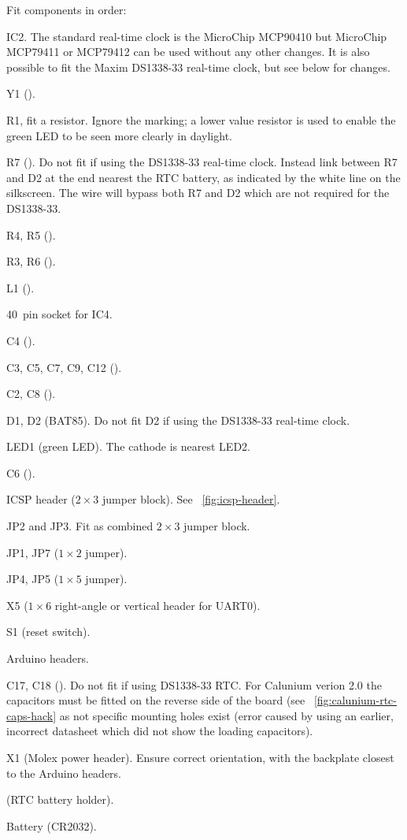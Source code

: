 Fit components in order:
\begin{buildorder}
\item IC2. The standard real-time clock is the MicroChip MCP90410 but
  MicroChip MCP79411 or MCP79412 can be used without any other
  changes.
  It is also possible to fit the Maxim DS1338-33 real-time clock,
  but see below for changes.
\item Y1 ().
\item R1, fit a  resistor. Ignore the  marking; a
  lower value resistor is used to enable the green LED to be seen
  more clearly in daylight.
\item R7 (). Do not fit if using the DS1338-33 real-time
  clock. Instead link between R7 and D2 at the end nearest the RTC
  battery, as indicated by the white line on the silkscreen. The wire
  will bypass both R7 and D2 which are not required for the DS1338-33.
\item R4, R5 ().
\item R3, R6 ().
\item L1 ().
\item 40~pin socket for IC4.
\item C4 ().
\item C3, C5, C7, C9, C12 ().
\item C2, C8 ().
\item D1, D2 (BAT85). Do not fit D2 if using the DS1338-33 real-time clock.
\item LED1 (green LED). The cathode is nearest LED2.
\item C6 ().
\item ICSP header ($2 \times 3$ jumper block). See
  \figurename~\ref{fig:icsp-header}.
\item JP2 and JP3. Fit as combined $2 \times 3$ jumper block.
\item JP1, JP7 ($1 \times 2$ jumper).
\item JP4, JP5 ($1 \times 5$ jumper).
\item X5 ($1 \times 6$ right-angle or vertical header for UART0).
\item S1 (reset switch).
\item Arduino headers. 
\item C17, C18 (). Do not fit if using DS1338-33 RTC. For
  Calunium verion 2.0 the capacitors must be fitted on the reverse
  side of the board (see \figurename~\ref{fig:calunium-rtc-caps-hack}
  as not specific mounting holes exist (error caused by using an
  earlier, incorrect datasheet which did not show the loading capacitors).
\item X1 (Molex power header). Ensure correct orientation, with the
  backplate closest to the Arduino headers.
\item {} (RTC battery holder).
\item Battery (CR2032).
\item {}
\end{buildorder}

